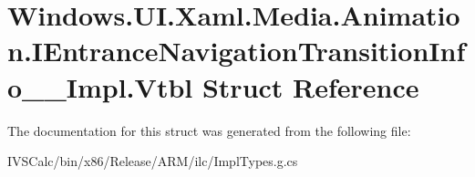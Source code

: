 \hypertarget{struct_windows_1_1_u_i_1_1_xaml_1_1_media_1_1_animation_1_1_i_entrance_navigation_transition_info_____impl_1_1_vtbl}{}\section{Windows.\+U\+I.\+Xaml.\+Media.\+Animation.\+I\+Entrance\+Navigation\+Transition\+Info\+\_\+\+\_\+\+Impl.\+Vtbl Struct Reference}
\label{struct_windows_1_1_u_i_1_1_xaml_1_1_media_1_1_animation_1_1_i_entrance_navigation_transition_info_____impl_1_1_vtbl}


The documentation for this struct was generated from the following file\+:\begin{DoxyCompactItemize}
\item 
I\+V\+S\+Calc/bin/x86/\+Release/\+A\+R\+M/ilc/Impl\+Types.\+g.\+cs\end{DoxyCompactItemize}
